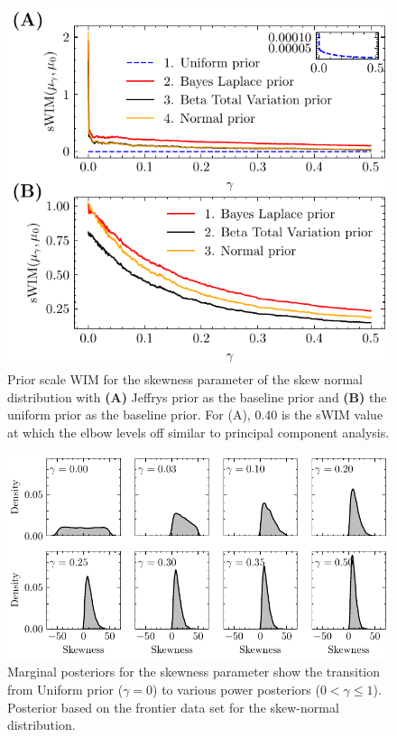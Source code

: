 \documentclass[12pt]{article}
\begin{document}
\begin{figure}[h]
\begin{center}
\includegraphics{imgs/swim_distskew.pdf}
\end{center}
\caption{Prior scale WIM for the skewness parameter of the skew normal distribution with \textbf{(A)} Jeffrys prior as the baseline prior and \textbf{(B)} the uniform prior as the baseline prior. For (A), 0.40 is the sWIM value at which the elbow levels off similar to principal component analysis.}\label{fig:swimdistskew}
\end{figure}

\begin{figure}
\begin{center}
\includegraphics{imgs/uniform_pow.pdf}
\end{center}
\caption{Marginal posteriors for the skewness parameter show the transition from Uniform prior ($\gamma=0$) to various power posteriors ($0<\gamma\leq1$).  Posterior based on the frontier data set for the skew-normal distribution.}\label{fig:skew_normal_powpos}
\end{figure}
\end{document}
